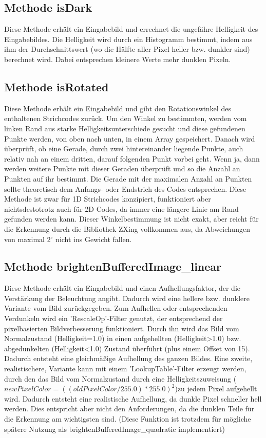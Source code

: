 \subsection*{Methode isDark}
Diese Methode erhält ein Eingabebild und errechnet die ungefähre Helligkeit des Eingabebildes.
Die Helligkeit wird durch ein Histogramm bestimmt, indem aus ihm der Durchschnittswert (wo die Hälfte aller Pixel heller bzw. dunkler sind) berechnet wird. Dabei entsprechen kleinere Werte mehr dunklen Pixeln.


\subsection*{Methode isRotated}
Diese Methode erhält ein Eingabebild und gibt den Rotationswinkel des enthalten\-en Strichcodes zurück.
Um den Winkel zu bestimmten, werden vom linken Rand aus starke Helligkeitsunterschiede gesucht und diese gefundenen Punkte werden, von oben nach unten, in einem Array gespeichert. Danach wird überprüft, ob eine Gerade, durch zwei hintereinander liegende Punkte, auch relativ nah an einem dritten, darauf folgenden Punkt vorbei geht. Wenn ja, dann werden weitere Punkte mit dieser Geraden überprüft und so die Anzahl an Punkten auf ihr bestimmt. Die Gerade mit der maximalen Anzahl an Punkten sollte theoretisch dem Anfangs- oder Endstrich des Codes entsprechen.
Diese Methode ist zwar für 1D Strichcodes konzipiert, funktioniert aber nichtsdestotrotz auch für 2D Codes, da immer eine längere Linie am Rand gefunden werden kann.
Dieser Winkelbestimmung ist nicht exakt, aber reicht für die Erkennung durch die Bibliothek ZXing vollkommen aus, da Abweichungen von maximal 2$^\circ $ nicht ins Gewicht fallen.
 

\subsection*{Methode brightenBufferedImage\_linear}
Diese Methode erhält ein Eingabebild und einen Aufhellungsfaktor, der die Verstärkung der Beleuchtung angibt. Dadurch wird eine hellere bzw. dunklere Variante vom Bild zurückgegeben.
Zum Aufhellen oder entsprechenden Verdunkeln wird ein 'RescaleOp'-Filter genutzt, der entsprechend der pixelbasierten Bildverbesserung funktioniert. Durch ihn wird das Bild vom Normalzustand (Helligkeit=1.0) in einen aufgehellten (Helligkeit>1.0) bzw. abgedunkelten (Helligkeit<1.0) Zustand überführt (plus einem Offset von 15).
Dadurch entsteht eine gleichmäßige Aufhellung des ganzen Bildes.
Eine zweite, realistischere, Variante kann mit einem 'LookupTable'-Filter erzeugt werden, durch den das Bild vom Normalzustand durch eine Helligkeitszuweisung
($newPixelColor = ((oldPixelColor/255.0) * 255.0)^2$)zu jedem Pixel aufgehellt wird.
Dadurch entsteht eine realistische Aufhellung, da dunkle Pixel schneller hell werden. Dies entspricht aber nicht den Anforderungen, da die dunklen Teile für die Erkennung am wichtigsten sind. (Diese Funktion ist trotzdem für mögliche spätere Nutzung als brightenBufferedImage\_quadratic implementiert)


